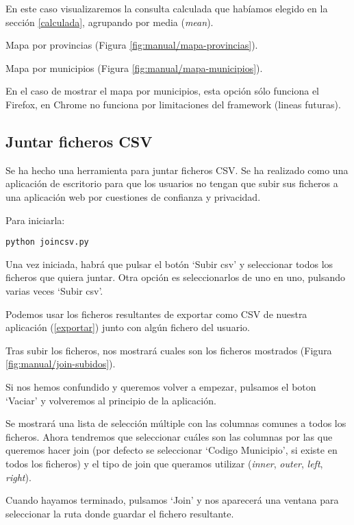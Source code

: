 En este caso visualizaremos la consulta calculada que habíamos elegido en la sección \ref{calculada}, agrupando por media (\textit{mean}).

Mapa por provincias (Figura \ref{fig:manual/mapa-provincias}).


Mapa por municipios (Figura \ref{fig:manual/mapa-municipios}).


En el caso de mostrar el mapa por municipios, esta opción sólo funciona el Firefox, en Chrome no funciona por limitaciones del framework (lineas futuras).

\subsection{Juntar ficheros CSV}

Se ha hecho una herramienta para juntar ficheros CSV. Se ha realizado como una aplicación de escritorio para que los usuarios no tengan que subir sus ficheros a una aplicación web por cuestiones de confianza y privacidad.

Para iniciarla:

\begin{lstlisting}
python joincsv.py
\end{lstlisting}


Una vez iniciada, habrá que pulsar el botón `Subir csv' y seleccionar todos los ficheros que quiera juntar. Otra opción es seleccionarlos de uno en uno, pulsando varias veces `Subir csv'.

Podemos usar los ficheros resultantes de exportar como CSV de nuestra aplicación (\ref{exportar}) junto con algún fichero del usuario.

Tras subir los ficheros, nos mostrará cuales son los ficheros mostrados (Figura \ref{fig:manual/join-subidos}).


Si nos hemos confundido y queremos volver a empezar, pulsamos el boton `Vaciar' y volveremos al principio de la aplicación.

Se mostrará una lista de selección múltiple con las columnas comunes a todos los ficheros. Ahora tendremos que seleccionar cuáles son las columnas por las que queremos hacer join (por defecto se seleccionar `Codigo Municipio', si existe en todos los ficheros) y el tipo de join que queramos utilizar (\textit{inner}, \textit{outer}, \textit{left}, \textit{right}).

Cuando hayamos terminado, pulsamos `Join' y nos aparecerá una ventana para seleccionar la ruta donde guardar el fichero resultante.

